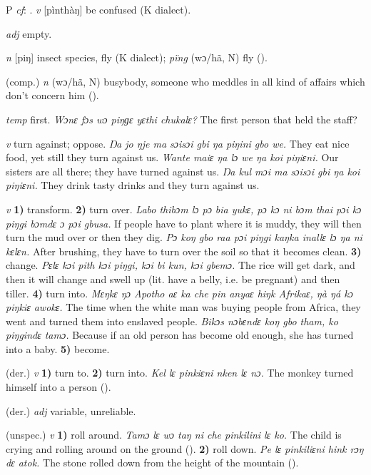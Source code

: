 \begin{letter}{P}
 \textit{cf}: . \textit{v} [pìnthàŋ] be confused (K dialect). 

 \textit{adj} empty.

 \textit{n} [piŋ] insect species, fly (K dialect); \textit{pïng} (wɔ/hã, N) fly (\citealt{Pichl1967}).

 (comp.) \textit{n} (wɔ/hã, N) busybody, someone who meddles in all kind of affairs which don't concern him (\citealt{Pichl1967}). 

 \textit{temp} first. \textit{Wɔnɛ fɔs wɔ piŋɡɛ yɛthi chukalɛ?} The first person that held the staff?

 \textit{v} turn against; oppose. \textit{Ŋa jo ŋje ma sɔisɔi gbi ŋa piŋini gbo we.} They eat nice food, yet still they turn against us. \textit{Wante maiɛ ŋa lɔ we ŋa koi piŋiɛni.} Our sisters are all there; they have turned against us. \textit{Ŋa kul mɔi ma sɔisɔi gbi ŋa koi piŋiɛni.} They drink tasty drinks and they turn against us.

 \textit{v} \textbf{1)} transform. \textbf{2)} turn over. \textit{Labo thibɔm lɔ pɔ bia yukɛ, pɔ kɔ ni bɔm thai pɔi kɔ piŋgi bɔmdɛ ɔ pɔi gbusa.} If people have to plant where it is muddy, they will then turn the mud over or then they dig. \textit{Pɔ koŋ gbo raa pɔi piŋgi kaŋka inallɛ lɔ ŋa ni kɛlɛn.} After brushing, they have to turn over the soil so that it becomes clean. \textbf{3)} change. \textit{Pɛlɛ kɔi pith kɔi piŋgi, kɔi bi kun, kɔi gbemɔ.} The rice will get dark, and then it will change and swell up (lit. have a belly, i.e. be pregnant) and then tiller. \textbf{4)} turn into. \textit{Mɛŋkɛ ŋɔ Apotho aɛ ka che pin anyaɛ hiŋk Afrikaɛ, ŋà ŋá kɔ piŋkiɛ awokɛ.} The time when the white man was buying people from Africa, they went and turned them into enslaved people. \textit{Bikɔs nɔbɛndɛ koŋ gbo tham, ko piŋgindɛ tamɔ.} Because if an old person has become old enough, she has turned into a baby. \textbf{5)} become.

 (der.) \textit{v} \textbf{1)} turn to. \textbf{2)} turn into. \textit{Kel lɛ pinkiɛni nken lɛ nɔ.} The monkey turned himself into a person (\citealt{Pichl1967}).

 (der.) \textit{adj} variable, unreliable.

 (unspec.) \textit{v} \textbf{1)} roll around. \textit{Tamɔ lɛ wɔ taŋ ni che pinkilini lɛ ko.} The child is crying and rolling around on the ground (\citealt{Pichl1967}). \textbf{2)} roll down. \textit{Pe lɛ pinkiliɛni hink rɔŋ dɛ atok.} The stone rolled down from the height of the mountain (\citealt{Pichl1967}). 


\end{letter}
